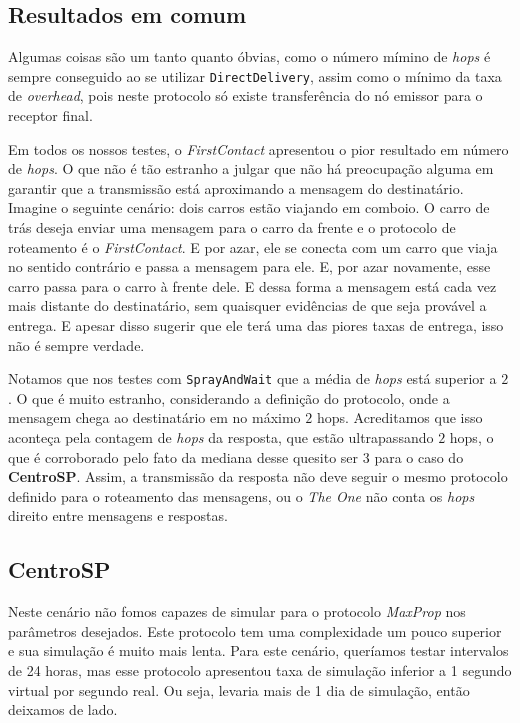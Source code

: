 \documentclass[conference]{IEEEtran}
\begin{document}
\subsection{Resultados em comum}
\label{sec:resultados:comum}
Algumas coisas são um tanto quanto óbvias, como o número mímino de \textit{hops} é sempre conseguido ao se utilizar \texttt{DirectDelivery}, assim como o mínimo da taxa de \textit{overhead}, pois neste protocolo só existe transferência do nó emissor para o receptor final.

Em todos os nossos testes, o \textit{FirstContact} apresentou o pior resultado em número de \textit{hops}. O que não é tão estranho a julgar que não há preocupação alguma em garantir que a transmissão está aproximando a mensagem do destinatário. Imagine o seguinte cenário: dois carros estão viajando em comboio. O carro de trás deseja enviar uma mensagem para o carro da frente e o protocolo de roteamento é o \textit{FirstContact}. E por azar, ele se conecta com um carro que viaja no sentido contrário e passa a mensagem para ele. E, por azar novamente, esse carro passa para o carro à frente dele. E dessa forma a mensagem está cada vez mais distante do destinatário, sem quaisquer evidências de que seja provável a entrega. E apesar disso sugerir que ele terá uma das piores taxas de entrega, isso não é sempre verdade.

Notamos que nos testes com \texttt{SprayAndWait} que a média de \textit{hops} está superior a $2$. O que é muito estranho, considerando a definição do protocolo, onde a mensagem chega ao destinatário em no máximo $2$ hops. Acreditamos que isso aconteça pela contagem de \textit{hops} da resposta, que estão ultrapassando $2$ hops, o que é corroborado pelo fato da mediana desse quesito ser $3$ para o caso do \textbf{CentroSP}. Assim, a transmissão da resposta não deve seguir o mesmo protocolo definido para o roteamento das mensagens, ou o \emph{The One} não conta os \textit{hops} direito entre mensagens e respostas.

\subsection{CentroSP}
Neste cenário não fomos capazes de simular para o protocolo \emph{MaxProp} nos parâmetros desejados. Este protocolo tem uma complexidade um pouco superior e sua simulação é muito mais lenta. Para este cenário, queríamos testar intervalos de 24 horas, mas esse protocolo apresentou taxa de simulação inferior a 1 segundo virtual por segundo real. Ou seja, levaria mais de 1 dia de simulação, então deixamos de lado.
\end{document}
